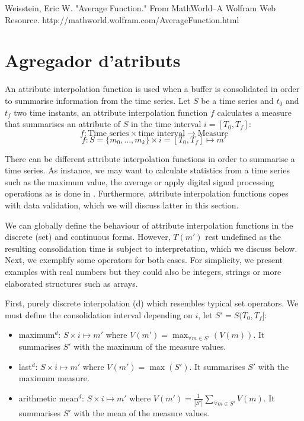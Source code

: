 Weisstein, Eric W. "Average Function." From MathWorld--A Wolfram Web Resource. http://mathworld.wolfram.com/AverageFunction.html






\section{Agregador d'atributs}
\label{sec:model:interpolador}




An attribute interpolation function is used when a buffer is
consolidated in order to summarise information from the time series.
Let $S$ be a time series and $t_0$ and $t_f$ two time instants, an
attribute interpolation function $f$ calculates a measure that
summarises an attribute of $S$ in the time interval $i=[T_0,T_f]$:
\[
f: \text{Time series} \times \text{time interval} \longrightarrow
\text{Measure}
\]
\[
f: S=\{m_0,\ldots,m_k\} \times i=[T_0,T_f] \mapsto m'
\]

There can be different attribute interpolation functions in order to
summarise a time series. As instance, we may want to calculate
statistics from a time series such as the maximum value, the average
or apply digital signal processing operations as is done in
\cite{zhang11}.  Furthermore, attribute interpolation functions copes
with data validation, which we will discuss latter in this section.

We can globally define the behaviour of attribute interpolation
functions in the discrete (set) and continuous forms. However, $T(m')$
rest undefined as the resulting consolidation time is subject to
interpretation, which we discuss below. Next, we exemplify some
operators for both cases. For simplicity, we present examples with
real numbers but they could also be integers, strings or more
elaborated structures such as arrays.


First, purely discrete interpolation (d) which resembles typical set
operators. We must define the consolidation interval depending on $i$,
let $S'=S(T_0,T_f]$:
\begin{itemize}
\item maximum$^d$: $S \times i \mapsto m'$ where $V(m') = \max_{\forall m
    \in S'}(V(m))$. It summarises $S'$ with the maximum of
  the measure values.
\item last$^d$: $S \times i \mapsto m'$ where $V(m') = \max(S')$. It
  summarises $S'$ with the maximum measure.
\item arithmetic mean$^d$: $S \times i \mapsto m'$ where $V(m') =
  \frac{1}{|S'|} \sum\limits_{\forall m\in S'} V(m)$. It
  summarises $S'$ with the mean of the measure values.
\end{itemize}


